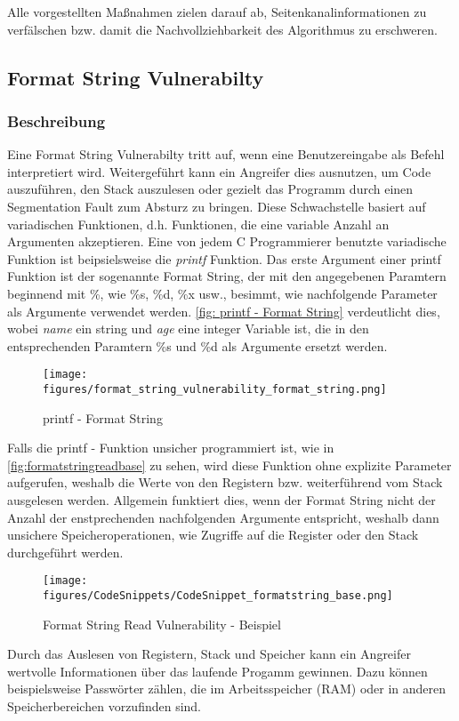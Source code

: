\documentclass[a4paper,
DIV=13,
12pt,
BCOR=10mm,
department=FakIM,
oneside,
parskip=half,
automark,
listof=totocnumbered,
bibliography=totocnumbered,
acronym=totocnumbered
] {OTHRartcl}
\begin{document}
Alle vorgestellten Maßnahmen zielen darauf ab, Seitenkanalinformationen zu verfälschen bzw. damit die Nachvollziehbarkeit des Algorithmus zu erschweren.

\subsection{Format String Vulnerabilty}
\subsubsection{Beschreibung}
Eine Format String Vulnerabilty tritt auf, wenn eine Benutzereingabe als Befehl interpretiert wird.
Weitergeführt kann ein Angreifer dies ausnutzen, um Code auszuführen, den Stack auszulesen oder gezielt das Programm durch einen Segmentation Fault zum Absturz zu bringen.
Diese Schwachstelle basiert auf variadischen Funktionen, d.h. Funktionen, die eine variable Anzahl an Argumenten akzeptieren.
Eine von jedem C Programmierer benutzte variadische Funktion ist beipsielsweise die \textit{printf} Funktion. \cite{OWASP Format String Vuln.}
Das erste Argument einer printf Funktion ist der sogenannte Format String, der mit den angegebenen Paramtern beginnend mit \%, wie \%s, \%d, \%x usw., besimmt, wie nachfolgende Parameter
als Argumente verwendet werden.
\autoref{fig: printf - Format String} verdeutlicht dies, wobei \textit{name} ein string und \textit{age} eine integer Variable ist, die in den entsprechenden
Paramtern \%s und \%d als Argumente ersetzt werden.
\begin{figure}[ht!]
  \begin{center}
    \texttt{[image: figures/format\_string\_vulnerability\_format\_string.png]}
    \caption{printf - Format String}
    \label{fig: printf - Format String}
  \end{center}
\end{figure}

Falls die printf - Funktion unsicher programmiert ist, wie in \autoref{fig:formatstringreadbase} zu sehen,
wird diese Funktion ohne explizite Parameter aufgerufen, weshalb die Werte von den Registern bzw. weiterführend vom Stack ausgelesen werden.
Allgemein funktiert dies, wenn der Format String nicht der Anzahl der enstprechenden nachfolgenden Argumente entspricht, weshalb dann unsichere Speicheroperationen, wie Zugriffe auf die Register oder den Stack
durchgeführt werden.
\begin{figure}[ht!]
  \begin{center}
    \texttt{[image: figures/CodeSnippets/CodeSnippet\_formatstring\_base.png]}
    \caption{Format String Read Vulnerability - Beispiel}
    \label{fig:formatstringreadbase}
  \end{center}
\end{figure}
Durch das Auslesen von Registern, Stack und Speicher kann ein Angreifer wertvolle Informationen über das laufende Progamm gewinnen.
Dazu können beispielsweise Passwörter zählen, die im Arbeitsspeicher (RAM) oder in anderen Speicherbereichen vorzufinden sind.
\end{document}
